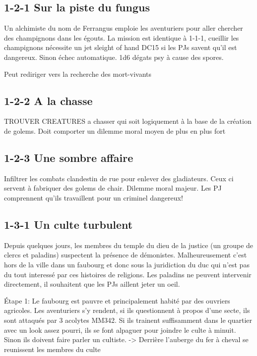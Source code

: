 \subsection*{1-2-1 Sur la piste du fungus}

Un alchimiste du nom de Ferrangus emploie les aventuriers pour aller chercher des champignons dans les
égouts. La mission est identique à 1-1-1, cueillir les champignons nécessite un jet sleight of hand DC15
si les PJs savent qu'il est dangereux. Sinon échec automatique. 1d6 dégats psy à cause des spores.

Peut rediriger vers la recherche des mort-vivants 

\subsection*{1-2-2 A la chasse}

TROUVER CREATURES a chasser qui soit logiquement à la base de la création de golems. Doit comporter
un dilemme moral moyen de plus en plus fort

\subsection*{1-2-3 Une sombre affaire}

Infiltrer les combats clandestin de rue pour enlever des gladiateurs. Ceux ci servent à fabriquer
des golems de chair. Dilemme moral majeur. Les PJ comprennent qu'ils travaillent pour un criminel
dangereux!

\subsection*{1-3-1 Un culte turbulent}

Depuis quelques jours, les membres du temple du dieu de la justice (un groupe de clercs et paladins) 
suspectent la présence de démonistes. Malheureusement c'est hors de la ville dans un faubourg 
et donc sous la juridiction du duc qui n'est pas du tout interessé par ces histoires de religions.
Les paladins ne peuvent intervenir directement, il souhaitent que les PJs aillent jeter un oeil.

Étape 1: Le faubourg est pauvre et principalement habité par des ouvriers agricoles. Les aventuriers
s'y rendent, si ils questionnent à propos d'une secte, ils sont attaqués par 3 acolytes MM342. Si ils
trainent suffisamment dans le quartier avec un look assez pourri, ils se font alpaguer pour joindre le 
culte à minuit. Sinon ils doivent faire parler un cultiste.
-> Derrière l'auberge du fer à cheval se reunissent les membres du culte

